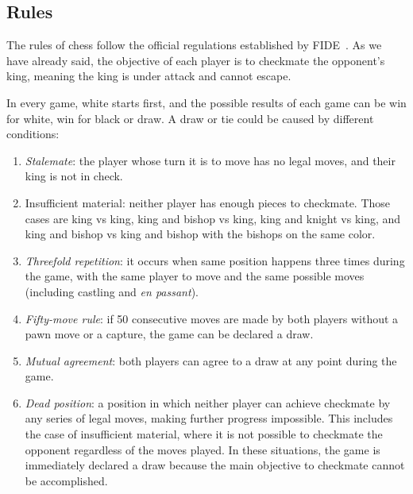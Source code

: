 \subsection*{Rules}\label{sec:rules}

The rules of chess follow the official regulations established by FIDE~\cite{LawsOfChess}. As we have already said, the objective of each player is to checkmate the opponent's king, meaning the king is under attack and cannot escape.

\vspace{1em}

\noindent In every game, white starts first, and the possible results of each game can be win for white, win for black or draw. A draw or tie could be caused by different conditions:

\begin{enumerate}
    \item \textit{Stalemate}: the player whose turn it is to move has no legal moves, and their king is not in check.
    \item Insufficient material: neither player has enough pieces to checkmate. Those cases are king vs king, king and bishop vs king, king and knight vs king, and king and bishop vs king and bishop with the bishops on the same color.
    \item \textit{Threefold repetition}: it occurs when same position happens three times during the game, with the same player to move and the same possible moves (including castling and \textit{en passant}).
    \item \textit{Fifty-move rule}: if 50 consecutive moves are made by both players without a pawn move or a capture, the game can be declared a draw.
    \item \textit{Mutual agreement}: both players can agree to a draw at any point during the game.
    \item \textit{Dead position}: a position in which neither player can achieve checkmate by any series of legal moves, making further progress impossible. This includes the case of insufficient material, where it is not possible to checkmate the opponent regardless of the moves played. In these situations, the game is immediately declared a draw because the main objective to checkmate cannot be accomplished.
\end{enumerate}

